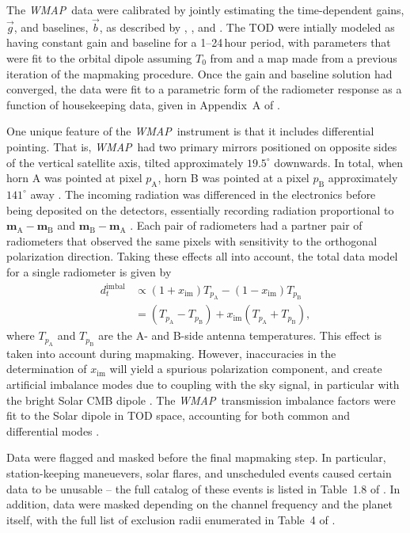 \documentclass[twocolumn]{../../common/aa}
\def\WMAP{\emph{WMAP}}
\newcommand{\A}[0]{\mathrm{A}}
\newcommand{\B}[0]{\mathrm{B}}
\newcommand{\bv}[0]{\vec{b}}
\newcommand{\g}[0]{\vec{g}}
\begin{document}
The \WMAP\ data were calibrated by jointly estimating the time-dependent gains, $\g$, and baselines, $\bv$, as described by \citet{hinshaw2007}, \citet{hinshaw2009}, and \citet{jarosik2010}.
The TOD were intially modeled as having
constant gain and baseline for a 1--24\,hour period, with parameters that were fit to the orbital
dipole assuming $T_0$ from \citet{mather:1999} and a map made from a previous
iteration of the mapmaking procedure. Once the gain and baseline solution had
converged, the data were fit to a parametric form of the radiometer response
as a function of housekeeping data, given in Appendix~A of \citet{wmapexsupp}.

One unique feature of the \WMAP\ instrument is that it includes differential pointing. That is, \WMAP\ had two primary mirrors positioned on opposite sides of the vertical satellite axis, tilted approximately $19.5^\circ$ downwards. In total, when horn A was pointed at pixel $p_\A$, horn B was pointed at a pixel $p_\B$ approximately $141^\circ$ away \citep{page2003:MAP}. The incoming radiation was differenced in the electronics before being deposited on the detectors, essentially recording radiation proportional to $\boldsymbol m_\A-\boldsymbol m_\B$ and $\boldsymbol m_\B-\boldsymbol m_\A$ \citep{jarosik2003:MAP}. Each pair of radiometers had a partner pair of radiometers that observed the same pixels with sensitivity to the orthogonal polarization direction. Taking these effects all into account, the total data model for a single radiometer is given by
\begin{align}
	d_t^\mathrm{imbal}&\propto (1+x_\mathrm{im})T_{p_\A}-(1-x_\mathrm{im})T_{p_\B}
	\\
	&=(T_{p_\A}-T_{p_\B})+x_\mathrm{im}(T_{p_\A}+T_{p_\B}),
\end{align}
where $T_{p_\A}$ and $T_{p_\B}$ are the A- and B-side antenna temperatures. This effect is taken into account during mapmaking. However, inaccuracies in the determination of $x_\mathrm{im}$ will yield a spurious polarization component, and create artificial imbalance modes due to coupling with the sky signal, in particular with the bright Solar CMB dipole \citep{jarosik2007}. The \WMAP\ transmission imbalance factors were fit to the Solar dipole in TOD space, accounting for both common and differential modes \citep{jarosik2003a,jarosik2007}.



Data were flagged and masked before the final mapmaking step. In particular, station-keeping maneuevers, solar flares, and unscheduled events caused certain data to be unusable -- the full catalog of these events is listed in Table~1.8 of \citet{wmapexsupp}. In addition, data were masked depending on the channel frequency and the planet itself, with the full list of exclusion radii enumerated in Table~4 of \citet{bennett2012}.
\end{document}
